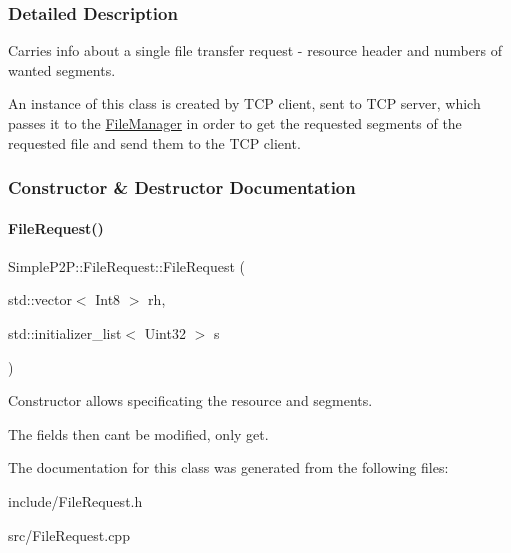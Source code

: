 \subsubsection{Detailed Description}
Carries info about a single file transfer request -\/ resource header and numbers of wanted segments. 

An instance of this class is created by T\+CP client, sent to T\+CP server, which passes it to the \hyperlink{classSimpleP2P_1_1FileManager}{File\+Manager} in order to get the requested segments of the requested file and send them to the T\+CP client. 

\subsubsection{Constructor \& Destructor Documentation}
\mbox{\label{classSimpleP2P_1_1FileRequest_a6e50d4f7d07a46ddcd72745ebc6e9e81}} 
\paragraph{\texorpdfstring{File\+Request()}{FileRequest()}}
{\footnotesize\ttfamily Simple\+P2\+P\+::\+File\+Request\+::\+File\+Request (\begin{DoxyParamCaption}\item[{std\+::vector$<$ Int8 $>$}]{rh,  }\item[{std\+::initializer\+\_\+list$<$ Uint32 $>$}]{s }\end{DoxyParamCaption})}



Constructor allows specificating the resource and segments. 

The fields then can\textquotesingle{}t be modified, only get. 

The documentation for this class was generated from the following files\+:\begin{DoxyCompactItemize}
\item 
include/File\+Request.\+h\item 
src/File\+Request.\+cpp\end{DoxyCompactItemize}
